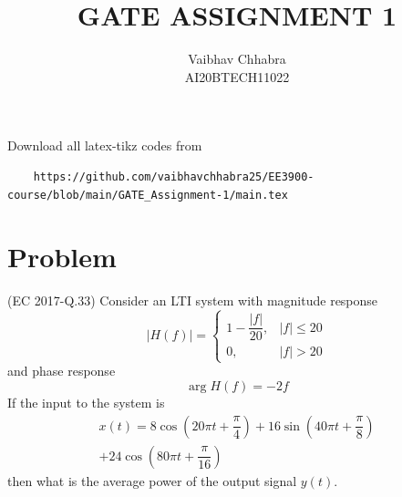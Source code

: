\documentclass[journal,12pt,twocolumn]{IEEEtran}
\begin{document}
     \def\topbox#1{\raisebox{-\baselineskip}[0in][0in]{#1}}
     \def\midbox#1{\raisebox{-0.5\baselineskip}[0in][0in]{#1}}
\vspace{3cm}
\title{GATE ASSIGNMENT 1}
\author{Vaibhav Chhabra\\ AI20BTECH11022}
\maketitle
\newpage
\bigskip
\renewcommand{\thefigure}{\theenumi}
\renewcommand{\thetable}{\theenumi}
Download all latex-tikz codes from 
%
\begin{lstlisting}
    https://github.com/vaibhavchhabra25/EE3900-course/blob/main/GATE_Assignment-1/main.tex
\end{lstlisting}
%
\section{Problem}
(EC 2017-Q.33) Consider an LTI system with magnitude response
\[
    |H(f)|=
    \begin{cases}
        1-\dfrac{|f|}{20}, & |f|\leq20\\
        0, & |f|>20
    \end{cases}
\]
and phase response
\[
    \arg{H(f)}=-2f
\]
If the input to the system is
\begin{align}
    x(t)=8\cos\left(20\pi t+\dfrac{\pi}{4}\right)+16\sin\left(40\pi t+\dfrac{\pi}{8}\right)\nonumber\\
    +24\cos\left(80\pi t+\dfrac{\pi}{16}\right) \nonumber
\end{align}
then what is the average power of the output signal $y(t)$.
\end{document}
